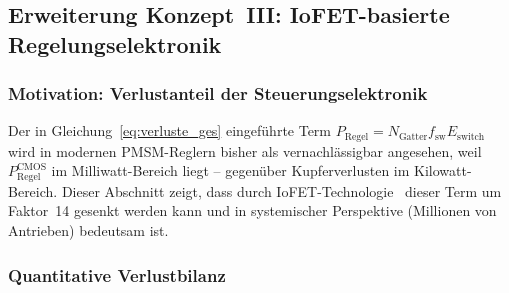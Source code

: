﻿\documentclass[12pt, a4paper]{report}
\theoremstyle{definition}
\theoremstyle{remark}
\begin{document}
\subsection{Erweiterung Konzept~III: IoFET-basierte Regelungselektronik}
\label{ss:iofet_regelung}
\label{ssec:iofet_regelung}

\subsubsection{Motivation: Verlustanteil der Steuerungselektronik}

Der in Gleichung~\eqref{eq:verluste_ges} eingeführte Term
$P_\text{Regel} = N_\text{Gatter} f_\text{sw} E_\text{switch}$ wird in
modernen PMSM-Reglern bisher als vernachlässigbar angesehen, weil
$P_\text{Regel}^\text{CMOS}$ im Milliwatt-Bereich liegt -- gegenüber
Kupferverlusten im Kilowatt-Bereich. Dieser Abschnitt zeigt, dass durch
IoFET-Technologie~\cite{ionotronik2026} dieser Term um Faktor~14 gesenkt
werden kann und in systemischer Perspektive (Millionen von Antrieben) bedeutsam
ist.

\subsubsection{Quantitative Verlustbilanz}
\end{document}
